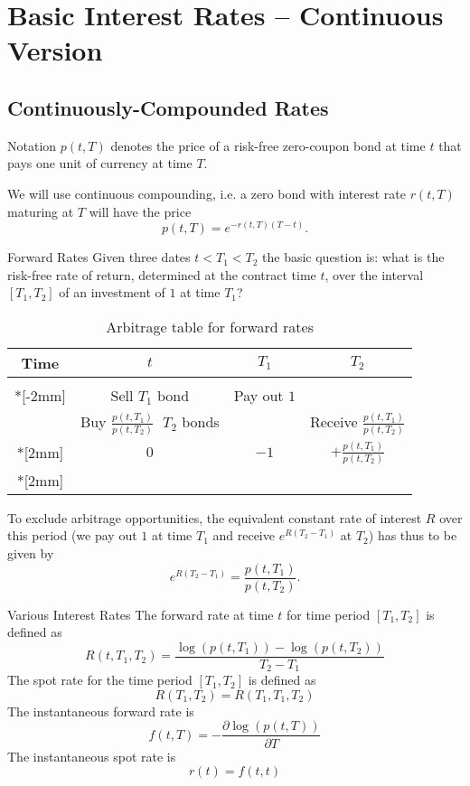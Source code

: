 \section{Basic Interest Rates -- Continuous Version}
\subsection{Continuously-Compounded Rates}
 
Notation
	$p(t,T)$ denotes the price of a risk-free zero-coupon bond at time
	$t$ that pays one unit of currency at time $T$.

	We will use continuous compounding, i.e. a zero bond with interest
	rate $r(t,T)$ maturing at $T$ will have the price
	$$p(t,T)=e^{-r(t,T)(T-t)}.$$


Forward Rates
	Given three dates $t < T_1 <
	T_2$ the basic question is: what is the risk-free rate of return,
	determined at the contract time $t$, over the interval $[T_1,T_2]$
	of an investment of $1$ at time $T_1$?\\

	\begin{table}[htbp]
	\begin{center}
	\begin{tabular}{|c|c|c|c|}
	\hline
	{\rule[-3mm]{0mm}{8mm} Time }& $t$ & $T_1$ & $T_2$\\
	\hline & & & \\*[-2mm]
	& Sell $T_1$ bond & Pay out $1$ & \\
	& Buy $\frac{p(t,T_1)}{p(t,T_2)}\;$ $T_2$ bonds & & Receive
	$\frac{p(t,T_1)}{p(t,T_2)}$\\*[2mm] \hline {\rule[-3mm]{0mm}{8mm}
	Net investment} & $0$ & $-1$ &
	$+\frac{p(t,T_1)}{p(t,T_2)}$\\*[2mm] \hline
	\end{tabular}
	\end{center}
	\caption{Arbitrage table for forward rates}
	\end{table}
	
	To exclude arbitrage opportunities, the equivalent constant rate
	of interest $R$ over this period (we pay out $1$ at time $T_1$ and
	receive $e^{R(T_2-T_1)}$ at $T_2$) has thus to be given by
		$$
		e^{R(T_2-T_1)} = \frac{p(t, T_1)}{p(t, T_2)}.
		$$

Various Interest Rates
	The forward rate at time $t$ for time period $[T_1,T_2]$ is defined as
		\[
		R(t,T_1,T_2)=\frac{\log(p(t,T_1))-\log(p(t,T_2))}{T_2-T_1}
		\]
 The spot rate for the time period $[T_1,T_2]$ is defined as
		\[
		R(T_1,T_2)=R(T_1,T_1,T_2)
		\]
 The instantaneous forward rate is
		\[
		f(t,T)=-\frac{\partial \log(p(t,T))}{\partial T}
		\]
  The instantaneous spot rate is
		\[
		r(t)=f(t,t)
		\]


